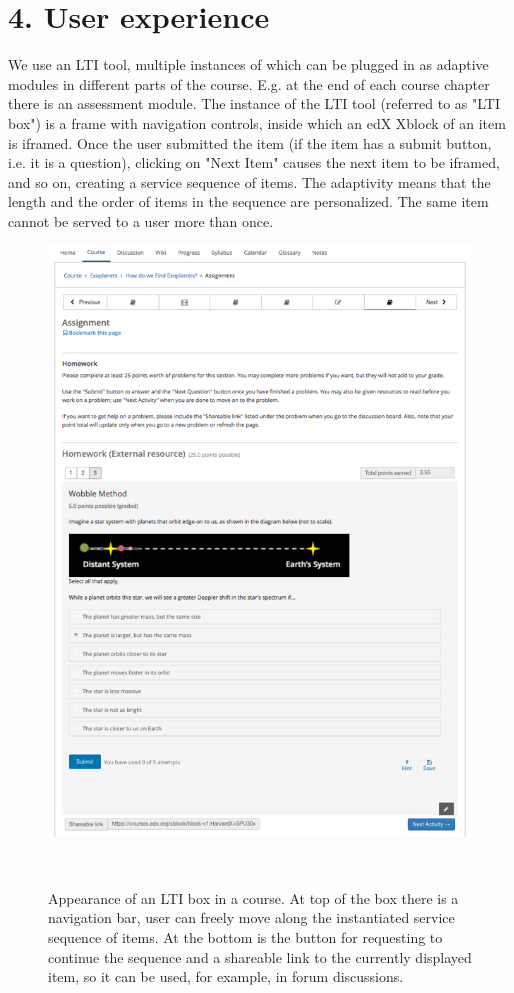 \documentclass{sigchi}
\newcommand{\1}{\mathbf{1}}
\begin{document}
\section{4. User experience}
We use an LTI tool, multiple instances of which can be plugged in as adaptive modules in different parts of the course. E.g. at the end of each course chapter there is an assessment module. The instance of the LTI tool (referred to as "LTI box") is a frame with navigation controls, inside which an edX Xblock of an item is iframed. Once the user submitted the item (if the item has a submit button, i.e. it is a question), clicking on "Next Item" causes the next item to be iframed, and so on, creating a service sequence of items. The adaptivity means that the length and the order of items in the sequence are personalized. The same item cannot be served to a user more than once.
\begin{figure}[t]
\centering
  \includegraphics[width=1\columnwidth]{lti-tool}
  \caption{Appearance of an LTI box in a course. At top of the box there is a navigation bar, user can freely move along the instantiated service sequence of items. At the bottom is the button for requesting to continue the sequence and a shareable link to the currently displayed item, so it can be used, for example, in forum discussions.
 }~\label{fig:lti-tool}
\end{figure}
\end{document}
